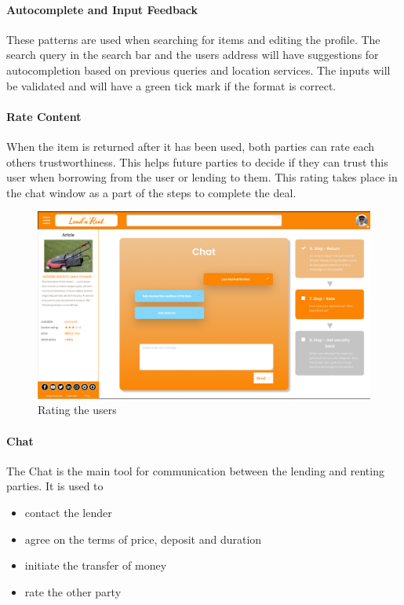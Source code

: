 	\paragraph{Autocomplete and Input Feedback}
		These patterns are used when searching for items and editing the profile. The search query in the search bar and the users address will have suggestions for autocompletion based on previous queries and location services. The inputs will be validated and will have a green tick mark if the format is correct.
	\par
	
	\paragraph{Rate Content}
		When the item is returned after it has been used, both parties can rate each others trustworthiness. This helps future parties to decide if they can trust this user when borrowing from the user or lending to them. This rating takes place in the chat window as a part of the steps to complete the deal.
		
		\begin{figure}[H]
			\centering
			\includegraphics[width=\linewidth]{abb/3_design_guidelines/rate.png}
			\caption{Rating the users}
			\label{fig:rate}
		\end{figure}
	\par
	
	\paragraph{Chat}
		The Chat is the main tool for communication between the lending and renting parties. It is used to 
		\begin{itemize}
			\item contact the lender
			\item agree on the terms of price, deposit and duration
			\item initiate the transfer of money
			\item rate the other party
		\end{itemize}
	\par
	

